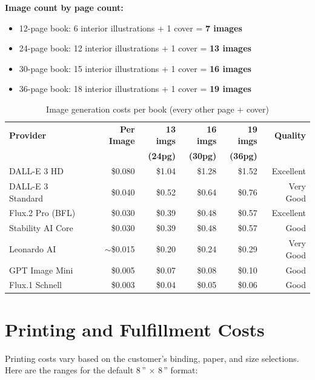 \documentclass[12pt, letterpaper, oneside]{book}
\begin{document}
\noindent \textbf{Image count by page count:}
\begin{itemize}[leftmargin=2em]
  \item 12-page book: 6 interior illustrations + 1 cover = \textbf{7 images}
  \item 24-page book: 12 interior illustrations + 1 cover = \textbf{13 images}
  \item 30-page book: 15 interior illustrations + 1 cover = \textbf{16 images}
  \item 36-page book: 18 interior illustrations + 1 cover = \textbf{19 images}
\end{itemize}

\begin{table}[H]
\centering
\small
\begin{tabularx}{\textwidth}{Xrrrrr}
\toprule
\textbf{Provider} & \textbf{Per Image} & \textbf{13 imgs} & \textbf{16 imgs} & \textbf{19 imgs} & \textbf{Quality} \\
& & \textbf{(24pg)} & \textbf{(30pg)} & \textbf{(36pg)} \\
\midrule
DALL-E 3 HD & \$0.080 & \$1.04 & \$1.28 & \$1.52 & Excellent \\
DALL-E 3 Standard & \$0.040 & \$0.52 & \$0.64 & \$0.76 & Very Good \\
Flux.2 Pro (BFL) & \$0.030 & \$0.39 & \$0.48 & \$0.57 & Excellent \\
Stability AI Core & \$0.030 & \$0.39 & \$0.48 & \$0.57 & Good \\
Leonardo AI & $\sim$\$0.015 & \$0.20 & \$0.24 & \$0.29 & Very Good \\
GPT Image Mini & \$0.005 & \$0.07 & \$0.08 & \$0.10 & Good \\
Flux.1 Schnell & \$0.003 & \$0.04 & \$0.05 & \$0.06 & Good \\
\bottomrule
\end{tabularx}
\caption{Image generation costs per book (every other page + cover)}
\end{table}

\section{Printing and Fulfillment Costs}

Printing costs vary based on the customer's binding, paper, and size selections. Here are the ranges for the default 8\,'' $\times$ 8\,'' format:
\end{document}
